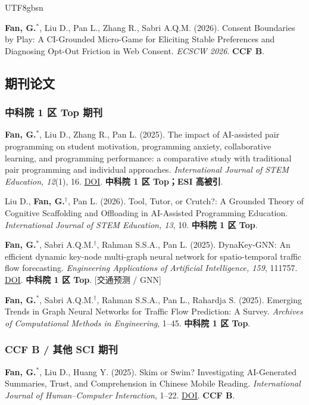 \documentclass[a4paper,10pt]{article}
\newcommand{\papertag}[1]{\textcolor{cvgray}{\footnotesize\textsf{[#1]}}}
\newcommand{\pubitem}[1]{\item #1}
\begin{document}
\begin{CJK*}{UTF8}{gbsn}
\begin{enumerate}[label=\textbf{[C\arabic*]},resume]
  \pubitem{\textbf{Fan, G.}$^{*}$, Liu D., Pan L., Zhang R., Sabri A.Q.M. (2026). Consent Boundaries by Play: A CI-Grounded Micro-Game for Eliciting Stable Preferences and Diagnosing Opt-Out Friction in Web Consent. \textit{ECSCW 2026}. \textbf{CCF B}. }
\end{enumerate}

\subsection*{期刊论文}
\subsubsection*{中科院 1 区 Top 期刊}
\begin{enumerate}[label=\textbf{[J\arabic*]}]
  \pubitem{\textbf{Fan, G.}$^{*}$, Liu D., Zhang R., Pan L. (2025). The impact of AI-assisted pair programming on student motivation, programming anxiety, collaborative learning, and programming performance: a comparative study with traditional pair programming and individual approaches. \textit{International Journal of STEM Education, 12}(1), 16. \href{https://doi.org/10.1186/s40594-025-00537-3}{DOI}. \textbf{中科院 1 区 Top；ESI 高被引}. }

  \pubitem{Liu D., \textbf{Fan, G.}$^{\dagger}$, Pan L. (2026). Tool, Tutor, or Crutch?: A Grounded Theory of Cognitive Scaffolding and Offloading in AI-Assisted Programming Education. \textit{International Journal of STEM Education, 13}, 10. \textbf{中科院 1 区 Top}. }

  \pubitem{\textbf{Fan, G.}$^{*}$, Sabri A.Q.M.$^{\dagger}$, Rahman S.S.A., Pan L. (2025). DynaKey-GNN: An efficient dynamic key-node multi-graph neural network for spatio-temporal traffic flow forecasting. \textit{Engineering Applications of Artificial Intelligence, 159}, 111757. \href{https://doi.org/10.1016/j.engappai.2025.111757}{DOI}. \textbf{中科院 1 区 Top}. \papertag{交通预测 / GNN}}

  \pubitem{\textbf{Fan, G.}$^{*}$, Sabri A.Q.M.$^{\dagger}$, Rahman S.S.A., Pan L., Rahardja S. (2025). Emerging Trends in Graph Neural Networks for Traffic Flow Prediction: A Survey. \textit{Archives of Computational Methods in Engineering}, 1--45. \textbf{中科院 1 区 Top}. }
\end{enumerate}

\subsubsection*{CCF B / 其他 SCI 期刊}
\begin{enumerate}[label=\textbf{[J\arabic*]},resume]
  \pubitem{\textbf{Fan, G.}$^{*}$, Liu D., Huang Y. (2025). Skim or Swim? Investigating AI-Generated Summaries, Trust, and Comprehension in Chinese Mobile Reading. \textit{International Journal of Human--Computer Interaction}, 1--22. \href{https://doi.org/10.1080/10447318.2025.2574513}{DOI}. \textbf{CCF B}. }
\end{enumerate}


\end{CJK*}
\end{document}
